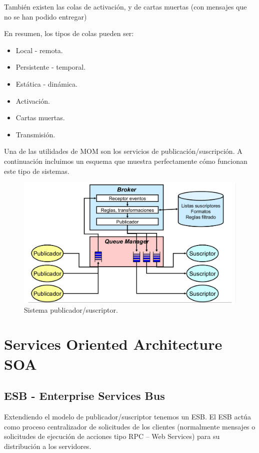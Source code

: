 También existen las colas de activación, y de cartas muertas (con mensajes que no se han podido entregar)


En resumen, los tipos de colas pueden ser:
\begin{itemize}
	\item Local - remota.
	\item Persistente - temporal.
	\item Estática - dinámica.
	\item Activación.
	\item Cartas muertas.
	\item Transmisión.
\end{itemize}

\begin{example}
Una de las utilidades de MOM son los servicios de publicación/suscripción. A continuación incluimos un esquema que muestra perfectamente cómo funcionan este tipo de sistemas.


\begin{figure}[hbtp]
\centering
\includegraphics[width=1\textwidth]{img/PubSusc.png}
\caption{Sistema publicador/suscriptor.}
\label{PubSusc}
\end{figure}
\newpage
\end{example}


\section{Services Oriented Architecture SOA}
\subsection{ESB - Enterprise Services Bus}

Extendiendo el modelo de publicador/suscriptor tenemos un ESB. El ESB actúa como proceso centralizador de solicitudes de los clientes (normalmente mensajes o solicitudes de ejecución de acciones tipo RPC – Web Services) para su distribución a los servidores.


